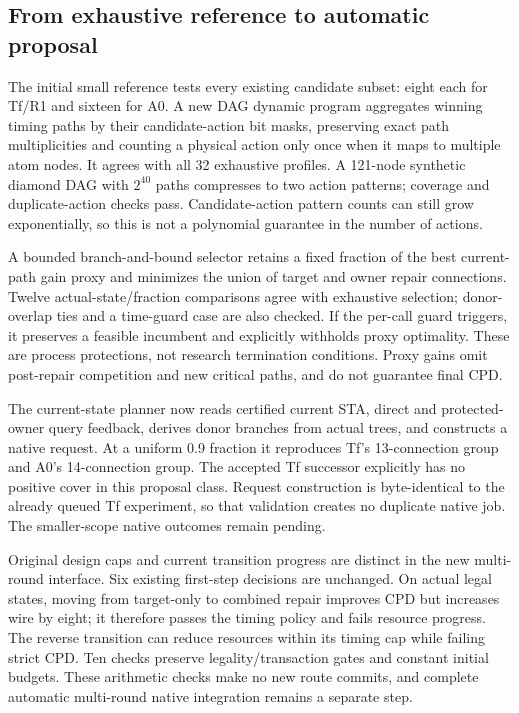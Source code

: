 \subsection{From exhaustive reference to automatic proposal}
The initial small reference tests every existing candidate subset: eight each for Tf/R1 and sixteen for A0. A new DAG dynamic program aggregates winning timing paths by their candidate-action bit masks, preserving exact path multiplicities and counting a physical action only once when it maps to multiple atom nodes. It agrees with all 32 exhaustive profiles. A 121-node synthetic diamond DAG with $2^{40}$ paths compresses to two action patterns; coverage and duplicate-action checks pass. Candidate-action pattern counts can still grow exponentially, so this is not a polynomial guarantee in the number of actions.

A bounded branch-and-bound selector retains a fixed fraction of the best current-path gain proxy and minimizes the union of target and owner repair connections. Twelve actual-state/fraction comparisons agree with exhaustive selection; donor-overlap ties and a time-guard case are also checked. If the per-call guard triggers, it preserves a feasible incumbent and explicitly withholds proxy optimality. These are process protections, not research termination conditions. Proxy gains omit post-repair competition and new critical paths, and do not guarantee final CPD.

The current-state planner now reads certified current STA, direct and protected-owner query feedback, derives donor branches from actual trees, and constructs a native request. At a uniform 0.9 fraction it reproduces Tf's 13-connection group and A0's 14-connection group. The accepted Tf successor explicitly has no positive cover in this proposal class. Request construction is byte-identical to the already queued Tf experiment, so that validation creates no duplicate native job. The smaller-scope native outcomes remain pending.

Original design caps and current transition progress are distinct in the new multi-round interface. Six existing first-step decisions are unchanged. On actual legal states, moving from target-only to combined repair improves CPD but increases wire by eight; it therefore passes the timing policy and fails resource progress. The reverse transition can reduce resources within its timing cap while failing strict CPD. Ten checks preserve legality/transaction gates and constant initial budgets. These arithmetic checks make no new route commits, and complete automatic multi-round native integration remains a separate step.
